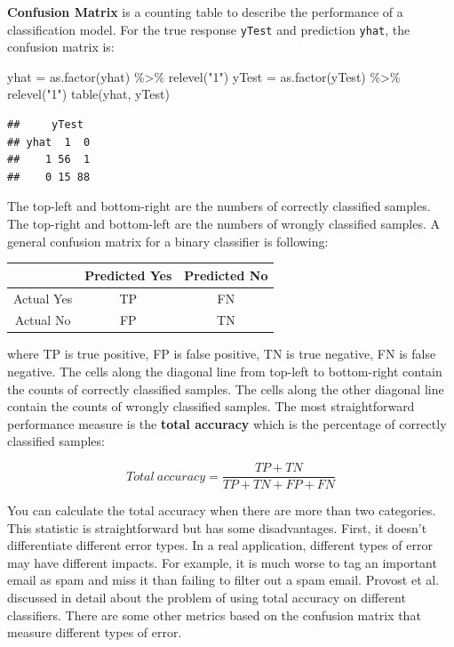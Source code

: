 \documentclass[
  12pt,
]{krantz}
\makeatletter
\newenvironment{Shaded}{\begin{snugshade}}{\end{snugshade}}
\newcommand{\FunctionTok}[1]{\textcolor[rgb]{0,0,0}{#1}}
\newcommand{\NormalTok}[1]{#1}
\newcommand{\OtherTok}[1]{\textcolor[rgb]{0.37,0.37,0.37}{#1}}
\newcommand{\SpecialCharTok}[1]{\textcolor[rgb]{0,0,0}{#1}}
\newcommand{\StringTok}[1]{\textcolor[rgb]{0.5,0.5,0.5}{#1}}
\newenvironment{kframe}{%
\medskip{}
\setlength{\fboxsep}{.8em}
 \def\at@end@of@kframe{}%
 \ifinner\ifhmode%
  \def\at@end@of@kframe{\end{minipage}}%
  \begin{minipage}{\columnwidth}%
 \fi\fi%
 \def\FrameCommand##1{\hskip\@totalleftmargin \hskip-\fboxsep
 \colorbox{shadecolor}{##1}\hskip-\fboxsep
     \hskip-\linewidth \hskip-\@totalleftmargin \hskip\columnwidth}%
 \MakeFramed {\advance\hsize-\width
   \@totalleftmargin\z@ \linewidth\hsize
   \@setminipage}}%
 {\par\unskip\endMakeFramed%
 \at@end@of@kframe}
\renewenvironment{Shaded}{\begin{kframe}}{\end{kframe}}
\makeatother
\begin{document}
\textbf{Confusion Matrix} is a counting table to describe the performance of a classification model. For the true response \texttt{yTest} and prediction \texttt{yhat}, the confusion matrix is:

\begin{Shaded}
\begin{Highlighting}[]
\NormalTok{yhat }\OtherTok{=} \FunctionTok{as.factor}\NormalTok{(yhat) }\SpecialCharTok{\%\textgreater{}\%} \FunctionTok{relevel}\NormalTok{(}\StringTok{"1"}\NormalTok{)}
\NormalTok{yTest }\OtherTok{=} \FunctionTok{as.factor}\NormalTok{(yTest) }\SpecialCharTok{\%\textgreater{}\%} \FunctionTok{relevel}\NormalTok{(}\StringTok{"1"}\NormalTok{)}
\FunctionTok{table}\NormalTok{(yhat, yTest)}
\end{Highlighting}
\end{Shaded}

\begin{verbatim}
##     yTest
## yhat  1  0
##    1 56  1
##    0 15 88
\end{verbatim}

The top-left and bottom-right are the numbers of correctly classified samples. The top-right and bottom-left are the numbers of wrongly classified samples. A general confusion matrix for a binary classifier is following:

\begin{longtable}[]{@{}ccc@{}}
\toprule()
& Predicted Yes & Predicted No \\
\midrule()
\endhead
Actual Yes & TP & FN \\
Actual No & FP & TN \\
\bottomrule()
\end{longtable}

where TP is true positive, FP is false positive, TN is true negative, FN is false negative. The cells along the diagonal line from top-left to bottom-right contain the counts of correctly classified samples. The cells along the other diagonal line contain the counts of wrongly classified samples. The most straightforward performance measure is the \textbf{total accuracy} which is the percentage of correctly classified samples:

\[Total\ accuracy = \frac{TP+TN}{TP+TN+FP+FN}\]

You can calculate the total accuracy when there are more than two categories. This statistic is straightforward but has some disadvantages. First, it doesn't differentiate different error types. In a real application, different types of error may have different impacts. For example, it is much worse to tag an important email as spam and miss it than failing to filter out a spam email. Provost et al. \citep{Provost1998} discussed in detail about the problem of using total accuracy on different classifiers. There are some other metrics based on the confusion matrix that measure different types of error.
\end{document}
